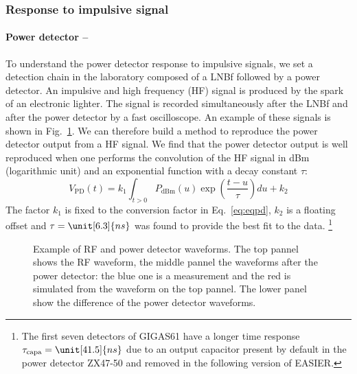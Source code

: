 \subsubsection{Response to impulsive signal}
\label{sec:elecimpulsive}
\paragraph{Power detector --}
To understand the power detector response to impulsive signals, we set
a detection chain  in the laboratory composed of a  LNBf followed by a
power  detector.  An  impulsive  and  high frequency  (HF)  signal  is
produced  by  the spark  of  an  electronic  lighter.  The  signal  is
recorded simultaneously after the LNBf and after the power detector by
a  fast  oscilloscope.   An  example  of these  signals  is  shown  in
Fig.~\ref{fig:powerdetsim}.   We  can  therefore  build  a  method  to
reproduce the  power detector output from  a HF signal.   We find that
the power  detector output  is well reproduced  when one  performs the
convolution  of  the  HF  signal  in dBm  (logarithmic  unit)  and  an
exponential function with a decay constant $\tau$:
\begin{equation}
  V_{\text{PD}}(t) = k_{1} \int_{t>0}P_{\text{dBm}}(u)\exp{\left(\frac{t-u}{\tau}\right)}du + k_{2}
  \label{eq:convolution}
\end{equation}
The   factor  $k_{1}$   is   fixed  to   the   conversion  factor   in
Eq.~\eqref{eq:eqpd},  $  k_{2}$  is  a  floating offset  and  $\tau  =
\unit[6.3]{ns}$ was found to provide the best fit to the data.
\footnote{The  first seven  detectors of  \mbox{GIGAS61} have  a  longer time
  response  $\tau_{\text{capa}} =  \unit[41.5]{ns}$ due  to  an output
  capacitor  present by  default  in the  power  detector ZX47-50  and
  removed in the following version of EASIER.}
\begin{figure}[!ht]
 \centering
 \hspace*{-3ex}
 \caption{Example of RF and  power detector waveforms.  The top pannel
   shows the  RF waveform, the  middle pannel the waveforms  after the
   power  detector: the  blue  one is  a  measurement and  the red  is
   simulated from  the waveform  on the top  pannel.  The  lower panel
   show the difference of the power detector waveforms.}
 \label{fig:powerdetsim}
\end{figure}

